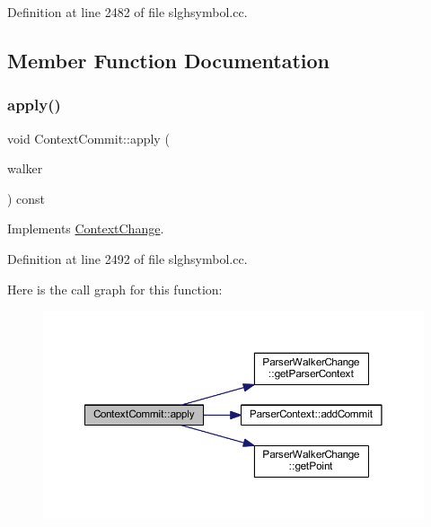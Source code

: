 Definition at line 2482 of file slghsymbol.\+cc.



\subsection{Member Function Documentation}
\mbox{\label{class_context_commit_a9f474b1411ad14072fbae6397298a449}} 
\subsubsection{\texorpdfstring{apply()}{apply()}}
{\footnotesize\ttfamily void Context\+Commit\+::apply (\begin{DoxyParamCaption}\item[{\mbox{\hyperlink{class_parser_walker_change}{Parser\+Walker\+Change}} \&}]{walker }\end{DoxyParamCaption}) const\hspace{0.3cm}{\ttfamily [virtual]}}



Implements \mbox{\hyperlink{class_context_change_a969bb7f403bf3a60f1fff0948ba84eeb}{Context\+Change}}.



Definition at line 2492 of file slghsymbol.\+cc.

Here is the call graph for this function\+:
\nopagebreak
\begin{figure}[H]
\begin{center}
\leavevmode
\includegraphics[width=350pt]{class_context_commit_a9f474b1411ad14072fbae6397298a449_cgraph}
\end{center}
\end{figure}
\mbox{\label{class_context_commit_aa3eed58d105a955678d30a2371fd7050}} 
